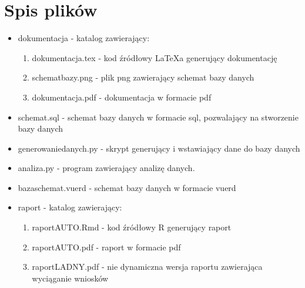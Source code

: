 \documentclass{article}
\begin{document}
\section{\LARGE Spis plików}
\begin{itemize}
    \item dokumentacja - katalog zawierający:
    \begin{enumerate}
        \item dokumentacja.tex - kod źródłowy LaTeXa generujący dokumentację
        \item schemat\textunderscore bazy.png - plik png zawierający schemat bazy danych
        \item dokumentacja.pdf - dokumentacja w formacie pdf
    \end{enumerate}
    \item schemat.sql - schemat bazy danych w formacie sql, pozwalający na stworzenie bazy danych
    \item generowanie\textunderscore danych.py - skrypt generujący i wstawiający dane do bazy danych
    \item analiza.py - program zawierający analizę danych.
    \item baza\textunderscore schemat.vuerd - schemat bazy danych w formacie vuerd
    \item raport - katalog zawierający:
    \begin{enumerate}
        \item raportAUTO.Rmd - kod źródłowy R generujący raport
        \item raportAUTO.pdf - raport w formacie pdf
        \item raportLADNY.pdf - nie dynamiczna wersja raportu zawierająca wyciąganie wniosków
    \end{enumerate}
\end{itemize}
\end{document}
